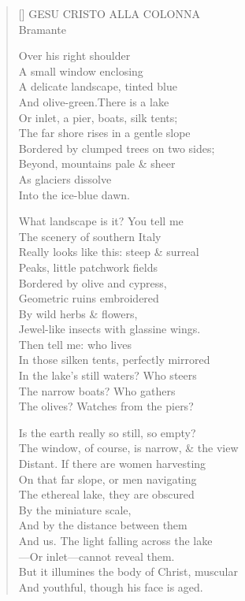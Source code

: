 \label{ch:milano_pinocoteca_brera}
\settowidth{\versewidth}{The window, of course, is narrow, \& the view}
\begin{verse}[\versewidth]
GESU CRISTO ALLA COLONNA\\
Bramante

Over his right shoulder\\
A small window enclosing\\
A delicate landscape, tinted blue\\
And olive-green.\qquad There is a lake\\
Or inlet, a pier, boats, silk tents;\\
The far shore rises in a gentle slope\\
Bordered by clumped trees on two sides;\\
Beyond, mountains pale \& sheer\\
As glaciers dissolve\\
Into the ice-blue dawn.

What landscape is it?  You tell me\\
The scenery of southern Italy\\
Really looks like this: steep \& surreal\\
Peaks, little patchwork fields\\
Bordered by olive and cypress,\\
Geometric ruins embroidered\\
By wild herbs \& flowers,\\
Jewel-like insects with glassine wings.\\
Then tell me: who lives\\
In those silken tents, perfectly mirrored\\
In the lake's still waters?  Who steers\\
The narrow boats?  Who gathers\\
The olives?  Watches from the piers?

Is the earth really so still, so empty?\\
The window, of course, is narrow, \& the view\\
Distant. If there are women harvesting\\
On that far slope, or men navigating\\
The ethereal lake, they are obscured\\
By the miniature scale,\\
And by the distance between them\\
And us.   The light falling across the lake\\
---Or inlet---cannot reveal them.\\
But it illumines the body of Christ, muscular\\
And youthful, though his face is aged.


\end{verse}
